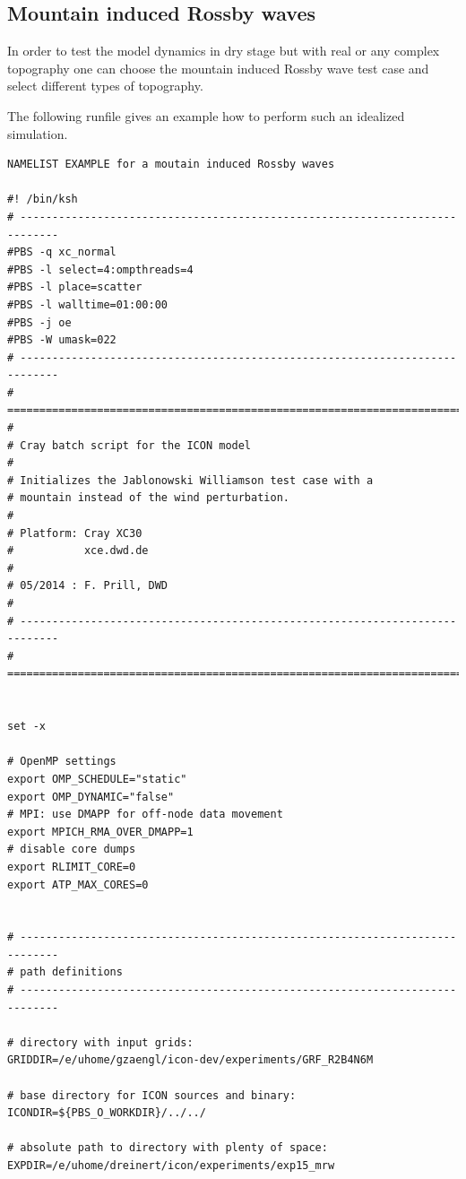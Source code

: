 \subsection{Mountain induced Rossby waves}

In order to test the model dynamics in dry stage but with real or any complex topography one can choose the mountain induced Rossby wave test case and select different types of topography.



The following runfile gives an example how to perform such an idealized simulation.

\begin{landscape}

\begin{Verbatim}[frame=single]
NAMELIST EXAMPLE for a moutain induced Rossby waves

#! /bin/ksh
# ----------------------------------------------------------------------------
#PBS -q xc_normal
#PBS -l select=4:ompthreads=4
#PBS -l place=scatter
#PBS -l walltime=01:00:00
#PBS -j oe
#PBS -W umask=022
# ----------------------------------------------------------------------------
# ============================================================================
#
# Cray batch script for the ICON model
#
# Initializes the Jablonowski Williamson test case with a 
# mountain instead of the wind perturbation.
#
# Platform: Cray XC30
#           xce.dwd.de
#
# 05/2014 : F. Prill, DWD
#
# ----------------------------------------------------------------------------
# ============================================================================


set -x

# OpenMP settings
export OMP_SCHEDULE="static"
export OMP_DYNAMIC="false"
# MPI: use DMAPP for off-node data movement
export MPICH_RMA_OVER_DMAPP=1
# disable core dumps
export RLIMIT_CORE=0
export ATP_MAX_CORES=0


# ----------------------------------------------------------------------------
# path definitions
# ----------------------------------------------------------------------------

# directory with input grids:
GRIDDIR=/e/uhome/gzaengl/icon-dev/experiments/GRF_R2B4N6M

# base directory for ICON sources and binary:
ICONDIR=${PBS_O_WORKDIR}/../../

# absolute path to directory with plenty of space:
EXPDIR=/e/uhome/dreinert/icon/experiments/exp15_mrw


\end{Verbatim}
\end{landscape}
